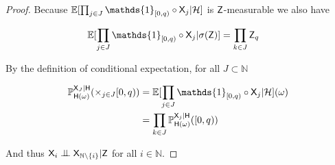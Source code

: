 \begin{proof}
Because $\mathbb{E}[\prod_{j\in J} \mathds{1}_{[0,q)}\circ \RV{X}_j|\sigalg{H}]$ is $\mathsf{Z}$-measurable we also have

\begin{align}
    \mathbb{E}[\prod_{j\in J} \mathds{1}_{[0,q)}\circ \RV{X}_j|\sigma(\RV{Z})] &= \prod_{k\in J} \RV{Z}_q
\end{align}

By the definition of conditional expectation, for all $J\subset \mathbb{N}$

\begin{align}
    \prob{P}_{\RV{H}(\omega)}^{\RV{X}_J|\RV{H}}(\times_{j\in J}[0,q)) &= \mathbb{E}[\prod_{j\in J} \mathds{1}_{[0,q)}\circ \RV{X}_j|\sigalg{H}](\omega)\\
                                                                      &= \prod_{k\in J} \prob{P}_{\RV{H}(\omega)}^{\RV{X}_j|\RV{H}}([0,q))
\end{align}

And thus $\RV{X}_i\CI\RV{X}_{\mathbb{N}\setminus\{i\}}|\RV{Z}$ for all $i\in\mathbb{N}$.
\end{proof}

